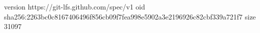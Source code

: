 version https://git-lfs.github.com/spec/v1
oid sha256:2263bc0c8167406496f856cb09f7fea998e5902a3e2196926c82cbf339a721f7
size 31097
